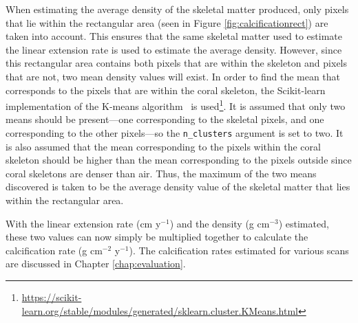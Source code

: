 When estimating the average density of the skeletal matter produced, only pixels that lie within the rectangular area (seen in Figure \ref{fig:calcificationrect}) are taken into account. This ensures that the same skeletal matter used to estimate the linear extension rate is used to estimate the average density. However, since this rectangular area contains both pixels that are within the skeleton and pixels that are not, two mean density values will exist. In order to find the mean that corresponds to the pixels that are within the coral skeleton, the Scikit-learn implementation of the K-means algorithm~\cite{kmeans} is used\footnote{\url{https://scikit-learn.org/stable/modules/generated/sklearn.cluster.KMeans.html}}. It is assumed that only two means should be present---one corresponding to the skeletal pixels, and one corresponding to the other pixels---so the \texttt{n\_clusters} argument is set to two. It is also assumed that the mean corresponding to the pixels within the coral skeleton should be higher than the mean corresponding to the pixels outside since coral skeletons are denser than air. Thus, the maximum of the two means discovered is taken to be the average density value of the skeletal matter that lies within the rectangular area.

With the linear extension rate (cm y$^{-1}$) and the density (g cm$^{-3}$) estimated, these two values can now simply be multiplied together to calculate the calcification rate (g cm$^{-2}$ y$^{-1}$). The calcification rates estimated for various scans are discussed in Chapter \ref{chap:evaluation}.